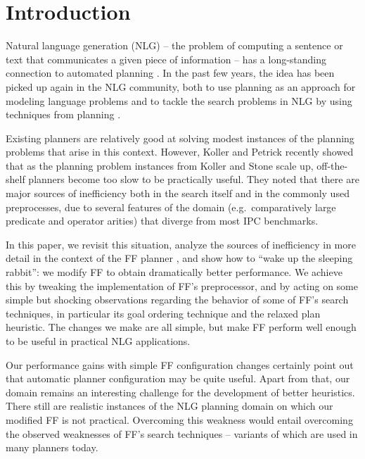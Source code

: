 
\section{Introduction} \label{sec:introduction}

Natural language generation (NLG) -- the problem of computing a
sentence or text that communicates a given piece of information -- has
a long-standing connection to automated planning
\cite{perrault80,appelt:planning}. In the past few years, the idea has
been picked up again in the NLG community, both to use planning as an
approach for modeling language problems
\cite{Steedman-Petrick:07,benotti08b} and to tackle the search
problems in NLG by using techniques from planning \cite{KolSto07}.

Existing planners are relatively good at solving modest instances of
the planning problems that arise in this context. However, Koller and
Petrick 
recently showed that as the planning problem instances from Koller and
Stone  scale up, off-the-shelf planners become too
slow to be practically useful. They noted that there are major sources
of inefficiency both in the search itself and in the commonly used
preprocesses, due to several features of the domain
(e.g.\ comparatively large predicate and operator arities) that
diverge from most IPC benchmarks.

In this paper, we revisit this situation, analyze the sources of
inefficiency in more detail in the context of the FF planner
\cite{HoffmannNebel01}, and show how to ``wake up the sleeping
rabbit'': we modify FF to obtain dramatically better performance. We
achieve this by tweaking the implementation of FF's preprocessor, and
by acting on some simple but shocking observations regarding the
behavior of some of FF's search techniques, in particular its goal
ordering technique and the relaxed plan heuristic. The changes we make
are all simple, but make FF perform well enough to be useful in
practical NLG applications.



Our performance gains with simple FF configuration changes certainly
point out that automatic planner configuration may be quite
useful. Apart from that, our domain remains an interesting challenge
for the development of better heuristics. There still are realistic
instances of the NLG planning domain on which our modified FF is not
practical. Overcoming this weakness would entail overcoming the
observed weaknesses of FF's search techniques -- variants of which are
used in many planners today.


